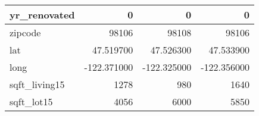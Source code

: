 \begin{table}[H]
\begin{tabular}{|l|r|r|r|}
\hline yr\_renovated & \cellcolor[rgb]{0.9, 0.54, 0.52} 0 & \cellcolor[rgb]{0.9, 0.54, 0.52} 0 & \cellcolor[rgb]{0.9, 0.54, 0.52} 0 \\
\hline zipcode & \cellcolor[rgb]{0.9, 0.54, 0.52} 98106 & 98108 & \cellcolor[rgb]{0.9, 0.54, 0.52} 98106 \\
\hline lat & \cellcolor[rgb]{0.9, 0.54, 0.52} 47.519700 & 47.526300 & 47.533900 \\
\hline long & \cellcolor[rgb]{0.9, 0.54, 0.52} -122.371000 & \cellcolor[rgb]{0.9, 0.54, 0.52} -122.325000 & \cellcolor[rgb]{0.9, 0.54, 0.52} -122.356000 \\
\hline sqft\_living15 & \cellcolor[rgb]{0.9, 0.54, 0.52} 1278 & 980 & 1640 \\
\hline sqft\_lot15 & \cellcolor[rgb]{0.9, 0.54, 0.52} 4056 & 6000 & 5850 \\
\hline
\end{tabular}
\end{table}
